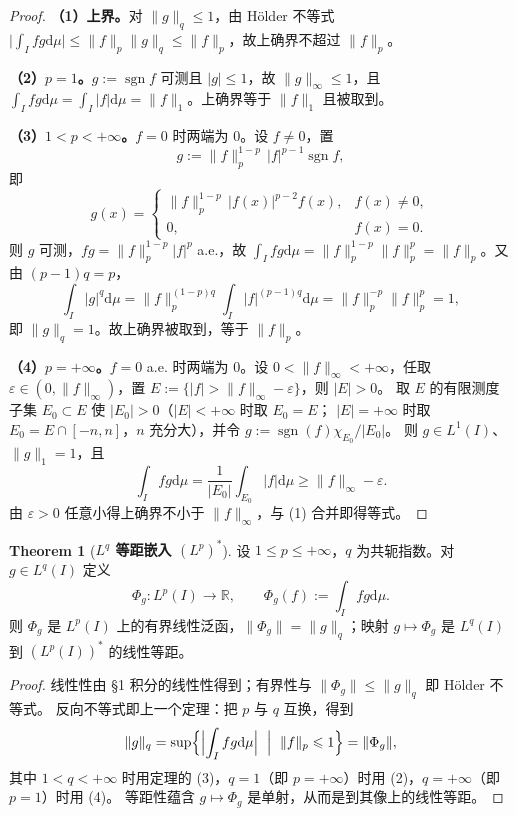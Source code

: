 \documentclass[oneside]{book}
\theoremstyle{definition}
\newcommand{\R}{\mathbb{R}}
\newcommand{\dd}{\mathrm{d}}
\DeclareMathOperator{\sgn}{sgn}
\theoremstyle{definition}
\newtheorem{theorem}{Theorem}[section]
\begin{document}
	\begin{proof}
		\textbf{（1）上界。}对 $\|g\|_q\leqslant1$，由 Hölder 不等式
		$\bigl|\int_I fg\dd\mu\bigr|\leqslant\|f\|_p\|g\|_q\leqslant\|f\|_p$，故上确界不超过 $\|f\|_p$。
		
		\textbf{（2）$p=1$。}$g:=\sgn f$ 可测且 $|g|\leqslant1$，故 $\|g\|_\infty\leqslant1$，且
		$\int_I fg\dd\mu=\int_I|f|\dd\mu=\|f\|_1$。上确界等于 $\|f\|_1$ 且被取到。
		
		\textbf{（3）$1<p<+\infty$。}$f=0$ 时两端为 $0$。设 $f\ne0$，置
		\[
		g:=\|f\|_p^{1-p}\,|f|^{p-1}\sgn f,
		\]
		即
		\[
		g(x)=
		\begin{cases}
			\|f\|_p^{1-p}\,|f(x)|^{p-2}f(x), & f(x)\ne0,\\[2pt]
			0, & f(x)=0 .
		\end{cases}
		\]
		则 $g$ 可测，$fg=\|f\|_p^{1-p}|f|^p$ a.e.，故
		$\int_I fg\dd\mu=\|f\|_p^{1-p}\|f\|_p^p=\|f\|_p$。又由 $(p-1)q=p$，
		\[
		\int_I|g|^q\dd\mu=\|f\|_p^{(1-p)q}\int_I|f|^{(p-1)q}\dd\mu
		=\|f\|_p^{-p}\|f\|_p^p=1,
		\]
		即 $\|g\|_q=1$。故上确界被取到，等于 $\|f\|_p$。
		
		\textbf{（4）$p=+\infty$。}$f=0$ a.e. 时两端为 $0$。设 $0<\|f\|_\infty<+\infty$，任取
		$\varepsilon\in(0,\|f\|_\infty)$，置 $E:=\{|f|>\|f\|_\infty-\varepsilon\}$，则 $|E|>0$。
		取 $E$ 的有限测度子集 $E_0\subset E$ 使 $|E_0|>0$（$|E|<+\infty$ 时取 $E_0=E$；
		$|E|=+\infty$ 时取 $E_0=E\cap[-n,n]$，$n$ 充分大），并令 $g:=\sgn(f)\chi_{E_0}/|E_0|$。
		则 $g\in L^1(I)$、$\|g\|_1=1$，且
		\[
		\int_I fg\dd\mu=\frac1{|E_0|}\int_{E_0}|f|\dd\mu\geqslant\|f\|_\infty-\varepsilon .
		\]
		由 $\varepsilon>0$ 任意小得上确界不小于 $\|f\|_\infty$，与 (1) 合并即得等式。
	\end{proof}
	
	\begin{theorem}[\bfseries{$L^q$ 等距嵌入 $(L^p)^*$}]
		设 $1\leqslant p\leqslant+\infty$，$q$ 为共轭指数。对 $g\in L^q(I)$ 定义
		\[
		\Phi_g:L^p(I)\to\R,\qquad \Phi_g(f):=\int_I f g\dd\mu .
		\]
		则 $\Phi_g$ 是 $L^p(I)$ 上的有界线性泛函，$\|\Phi_g\|=\|g\|_q$；映射 $g\mapsto\Phi_g$ 是 $L^q(I)$ 到
		$(L^p(I))^*$ 的线性等距。
	\end{theorem}
	
	\begin{proof}
		线性性由 §1 积分的线性性得到；有界性与 $\|\Phi_g\|\leqslant\|g\|_q$ 即 Hölder 不等式。
		反向不等式即上一个定理：把 $p$ 与 $q$ 互换，得到
		\[
		\|g\|_q=\sup\Bigl\{\Bigl|\int_I f g\dd\mu\Bigr|\ \Bigm|\ \|f\|_p\leqslant1\Bigr\}=\|\Phi_g\|,
		\]
		其中 $1<q<+\infty$ 时用定理的 (3)，$q=1$（即 $p=+\infty$）时用 (2)，$q=+\infty$（即 $p=1$）时用 (4)。
		等距性蕴含 $g\mapsto\Phi_g$ 是单射，从而是到其像上的线性等距。
	\end{proof}
	
\end{document}
